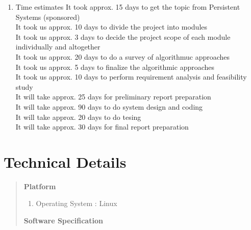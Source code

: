 \documentclass[12pt,a4paper,final]{article}
\begin{document}
\begin{flushleft}
\begin{enumerate}
\begin{enumerate}
\item Time estimates
It took approx. 15 days to get the topic from Persistent Systems (sponsored)\\
It took us approx. 10 days to divide the project into modules\\
It took us approx. 3 days to decide the project scope of each module individually and altogether\\
It took us approx. 20 days to do a survey of algorithmuc approaches\\
It took us approx. 5 days to finalize the algorithmic approaches\\
It took us approx. 10 days to perform requirement analysis and feasibility study\\
It will take approx. 25 days for preliminary report preparation\\
It will take approx. 90 days to do system design and coding\\
It will take approx. 20 days to do tesing \\
It will take approx. 30 days for final report preparation \\
\end{enumerate}

\end{enumerate}

\pagebreak
\noindent
\section{Technical Details}
\begin{quotation}
\textbf{Platform}
\begin{enumerate}

\item
Operating System : Linux

\end{enumerate}

\textbf{Software Specification}
\begin{enumerate}


\end{enumerate}
\end{quotation}
\end{flushleft}
\end{document}
